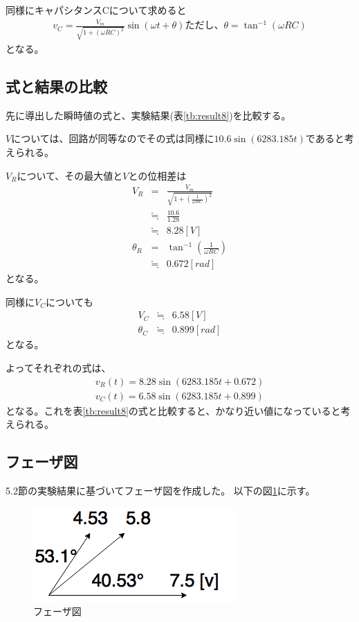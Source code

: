 \documentclass[dvipdfmx]{jsarticle}
\begin{document}
同様にキャパシタンスCについて求めると
\begin{eqnarray*}
  v_C = \frac{V_m}{\sqrt{1 + (\omega RC)^2}}\sin(\omega t + \theta) ただし、\theta = \tan^{-1}(\omega RC)
\end{eqnarray*}
となる。

\subsection{式と結果の比較}
先に導出した瞬時値の式と、実験結果(表\ref{tb:result8})を比較する。

$V$については、回路が同等なのでその式は同様に$10.6\sin(6283.185t)$であると考えられる。

$V_R$について、その最大値と$V$との位相差は
\begin{eqnarray*}
  V_R & = & \frac{V_m}{\sqrt{1 + (\frac{1}{\omega RC})^2}}\\
  & \fallingdotseq & \frac{10.6}{1.28}\\
  & \fallingdotseq & 8.28 [V]\\
  \theta_R & = &\tan^{-1}(\frac{1}{\omega RC})\\
  & \fallingdotseq & 0.672 [rad]
\end{eqnarray*}
となる。

同様に$V_C$についても
\begin{eqnarray*}
  V_C & \fallingdotseq & 6.58 [V]\\
  \theta_C & \fallingdotseq & 0.899 [rad]
\end{eqnarray*}
となる。

よってそれぞれの式は、
\begin{eqnarray*}
  v_R(t) = 8.28\sin(6283.185t + 0.672)\\
  v_C(t) = 6.58\sin(6283.185t + 0.899)
\end{eqnarray*}
となる。これを表\ref{tb:result8}の式と比較すると、かなり近い値になっていると考えられる。

\subsection{フェーザ図}
5.2節の実験結果に基づいてフェーザ図を作成した。
以下の図\ref{fig:f}に示す。
\begin{figure}[h]
  \centering
  \includegraphics[scale=0.4]{f.png}
  \caption{フェーザ図}
  \label{fig:f}
\end{figure}
\end{document}
